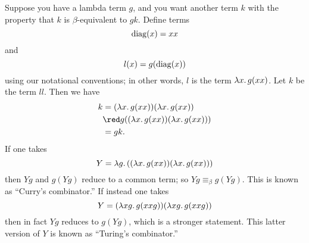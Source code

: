 \documentclass[../../../include/open-logic-section]{subfiles}
\begin{document}

Suppose you have a lambda term $g$, and you want another term $k$ with
the property that $k$ is $\beta$-equivalent to $gk$. Define terms
\[
\mathrm{diag}(x) = xx
\]
and
\[
l(x) = g(\mathrm{diag}(x))
\]
using our notational conventions; in other words, $l$ is the term
$\lambd[x][g(xx)]$. Let $k$ be the term $ll$. Then we have
\begin{align*}
k & = (\lambd[x][g(xx)])(\lambd[x][g(xx)]) \\
& \red  g((\lambd[x][g(xx)])(\lambd[x][g(xx)])) \\
& = gk.
\end{align*}
If one takes
\[
Y = \lambd[g][((\lambd[x][g(xx)])(\lambd[x][g(xx)]))]
\]
then $Yg$ and $g(Yg)$ reduce to a common term; so $Yg \equiv_\beta
g(Yg)$. This is known as ``Curry's combinator.'' If instead one takes
\[
Y = (\lambd[xg][g(xxg)])(\lambd[xg][g(xxg)])
\]
then in fact $Yg$ reduces to $g(Yg)$, which is a stronger statement.
This latter version of $Y$ is known as ``Turing's combinator.''
\end{document}

